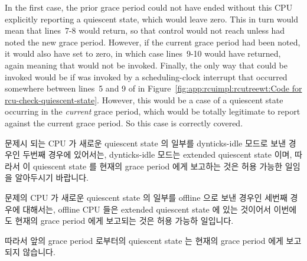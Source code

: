 {	In the first case, the prior grace period could not have
	ended without this CPU explicitly reporting a quiescent
	state, which would leave  zero.
	This in turn would mean that lines~7-8 would return, so
	that control would not reach  unless
	 had noted the new grace
	period.
	However, if the current grace period had been noted, it would
	also have set  to zero, in which case
	lines~9-10 would have returned, again meaning that 
	would not be invoked.
	Finally, the only way that  could be invoked
	would be if  was invoked by
	a scheduling-clock interrupt that occurred somewhere between
	lines~5 and 9 of  in
	Figure~\ref{fig:app:rcuimpl:rcutreewt:Code for rcu-check-quiescent-state}.
	However, this would be a case of a quiescent state occurring
	in the \emph{current} grace period, which would be totally
	legitimate to report against the current grace period.
	So this case is correctly covered.
	\fi

	문제시 되는 CPU 가 새로운 quiescent state 의 일부를 dynticks-idle
	모드로 보낸 경우인 두번째 경우에 있어서는, dynticks-idle 모드는
	extended quiescent state 이며, 따라서 이 quiescent state 를 현재의
	grace period 에게 보고하는 것은 허용 가능한 일임을 알아두시기 바랍니다.
	
	문제의 CPU 가 새로운 quiescent state 의 일부를 offline 으로 보낸 경우인
	세번째 경우에 대해서는, offline CPU 들은 extended quiescent state 에
	있는 것이어서 이번에도 현재의 grace period 에게 보고되는 것은 허용
	가능하 일입니다.

	따라서 앞의 grace period 로부터의 quiescent state 는 현재의 grace
	period 에게 보고되지 않습니다.
	\iffalse

	In the second case, where the CPU in question spent part of
	the new quiescent state in dynticks-idle mode, note that
	dynticks-idle mode is an extended quiescent state, hence
	it is again permissible to report this quiescent state against
	the current grace period.

	In the third case, where the CPU in question spent part of the
	new quiescent state offline, note that offline CPUs are in
	an extended quiescent state, which is again permissible to
	report against the current grace period.

	So quiescent states from prior grace periods are never reported
	against the current grace period.
	\fi
} \QuickQuizEnd

